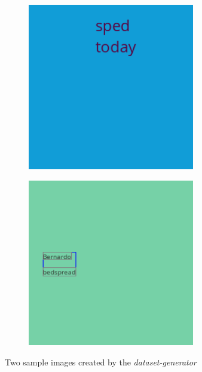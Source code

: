 \begin{figure}[h!]
    \begin{subfigure}[t]{0.5\textwidth}
        \centering
        \includegraphics[width=0.8\textwidth]{figures/dataset-generator-sample-1.png}
    \end{subfigure}
    \begin{subfigure}[t]{0.5\textwidth}
        \centering
        \includegraphics[width=0.8\textwidth]{figures/dataset-generator-sample-debug.png}
    \end{subfigure}
    \caption{Two sample images created by the \textit{dataset-generator}}
    \label{fig:dataset-generator-sample-output}
\end{figure}

